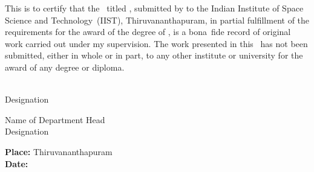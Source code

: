 This is to certify that the \Doctype\ titled \textbf{\textit{\Title}},
submitted by {\bf\Author} to the Indian Institute of Space Science and
Technology~(IIST), Thiruvananthapuram, in partial fulfillment of the
requirements for the award of the degree of
{\bf\Degreetext}, is a bona~fide record of original work
carried out under my supervision. The work presented in this \Doctype\
has not been submitted, either in whole or in part, to any other
institute or university for the award of any degree or diploma.


\vspace{35mm}
\noindent
\begin{minipage}{0.5\textwidth}
\Advisor\\
Designation
\end{minipage}
\hspace{2cm}
\begin{minipage}{0.5\textwidth}
Name of Department Head\\
Designation
\end{minipage}

\vspace{30mm}
\noindent
\textbf{Place: }Thiruvananthapuram\\
\textbf{Date: \ }\Date


